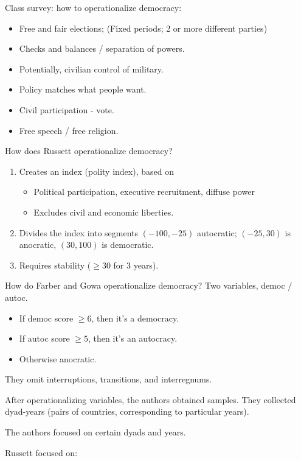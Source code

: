 \documentclass{article}
\begin{document}
Class survey: how to operationalize democracy:

\begin{itemize}
  \item Free and fair elections; (Fixed periods; 2 or more different parties)
  \item Checks and balances / separation of powers.
  \item Potentially, civilian control of military.
  \item Policy matches what people want.
  \item Civil participation - vote.
  \item Free speech / free religion.
\end{itemize}

How does Russett operationalize democracy?

\begin{enumerate}
  \item Creates an index (polity index), based on
    \begin{itemize}
      \item Political participation, executive recruitment, diffuse power
      \item Excludes civil and economic liberties.
    \end{itemize}
  \item Divides the index into segments $(-100, -25)$ autocratic; $(-25, 30)$ is anocratic, $(30, 100)$ is democratic.
  \item Requires stability ($\geq 30$ for 3 years).
\end{enumerate}

How do Farber and Gowa operationalize democracy?  Two variables, democ / autoc.

\begin{itemize}
  \item If democ score $\geq 6$, then it's a democracy.
  \item If autoc score $\geq 5$, then it's an autocracy.
  \item Otherwise anocratic.
\end{itemize}

They omit interruptions, transitions, and interregnums.

After operationalizing variables, the authors obtained samples.  They collected dyad-years (pairs of countries, corresponding to particular years).

The authors focused on certain dyads and years.

Russett focused on:
\end{document}
